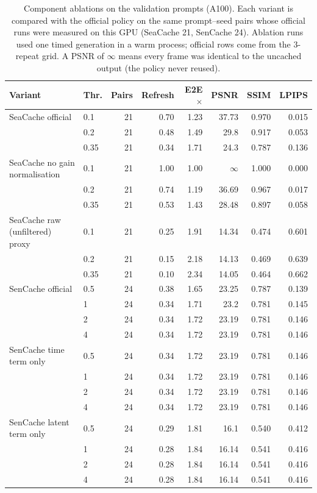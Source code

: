 \begin{table}[htbp]\centering\small
\begin{tabular}{@{}llrrrrrr@{}}\toprule
Variant & Thr. & Pairs & Refresh & E2E $\times$ & PSNR & SSIM & LPIPS\\\midrule
SeaCache official & 0.1 & 21 & 0.70 & 1.23 & 37.73 & 0.970 & 0.015 \\
 & 0.2 & 21 & 0.48 & 1.49 & 29.8 & 0.917 & 0.053 \\
 & 0.35 & 21 & 0.34 & 1.71 & 24.3 & 0.787 & 0.136 \\
\addlinespace
SeaCache no gain normalisation & 0.1 & 21 & 1.00 & 1.00 & $\infty$ & 1.000 & 0.000 \\
 & 0.2 & 21 & 0.74 & 1.19 & 36.69 & 0.967 & 0.017 \\
 & 0.35 & 21 & 0.53 & 1.43 & 28.48 & 0.897 & 0.058 \\
\addlinespace
SeaCache raw (unfiltered) proxy & 0.1 & 21 & 0.25 & 1.91 & 14.34 & 0.474 & 0.601 \\
 & 0.2 & 21 & 0.15 & 2.18 & 14.13 & 0.469 & 0.639 \\
 & 0.35 & 21 & 0.10 & 2.34 & 14.05 & 0.464 & 0.662 \\
\addlinespace
SenCache official & 0.5 & 24 & 0.38 & 1.65 & 23.25 & 0.787 & 0.139 \\
 & 1 & 24 & 0.34 & 1.71 & 23.2 & 0.781 & 0.145 \\
 & 2 & 24 & 0.34 & 1.72 & 23.19 & 0.781 & 0.146 \\
 & 4 & 24 & 0.34 & 1.72 & 23.19 & 0.781 & 0.146 \\
\addlinespace
SenCache time term only & 0.5 & 24 & 0.34 & 1.72 & 23.19 & 0.781 & 0.146 \\
 & 1 & 24 & 0.34 & 1.72 & 23.19 & 0.781 & 0.146 \\
 & 2 & 24 & 0.34 & 1.72 & 23.19 & 0.781 & 0.146 \\
 & 4 & 24 & 0.34 & 1.72 & 23.19 & 0.781 & 0.146 \\
\addlinespace
SenCache latent term only & 0.5 & 24 & 0.29 & 1.81 & 16.1 & 0.540 & 0.412 \\
 & 1 & 24 & 0.28 & 1.84 & 16.14 & 0.541 & 0.416 \\
 & 2 & 24 & 0.28 & 1.84 & 16.14 & 0.541 & 0.416 \\
 & 4 & 24 & 0.28 & 1.84 & 16.14 & 0.541 & 0.416 \\
\bottomrule\end{tabular}
\caption{Component ablations on the validation prompts (A100). Each variant is compared with the official policy on the
same prompt--seed pairs whose official runs were measured on this GPU (SeaCache 21, SenCache 24). Ablation runs used one
timed generation in a warm process; official rows come from the 3-repeat grid. A PSNR of $\infty$ means every frame was
identical to the uncached output (the policy never reused).}
\label{tab:ablation}\end{table}
